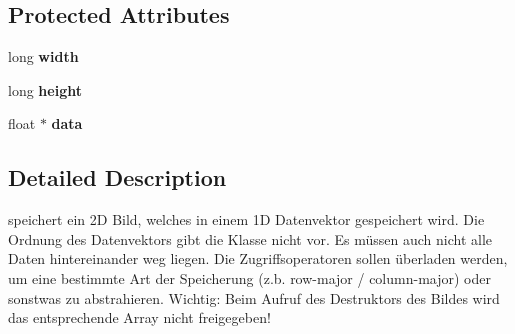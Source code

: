 \subsection*{Protected Attributes}
\begin{DoxyCompactItemize}
\item 
\hypertarget{classfloat__image_a92e539199f8cfa3c8ece64e2bdca54c7}{long {\bfseries width}}\label{classfloat__image_a92e539199f8cfa3c8ece64e2bdca54c7}

\item 
\hypertarget{classfloat__image_af7c859a1a77e6886adff0fd47976d069}{long {\bfseries height}}\label{classfloat__image_af7c859a1a77e6886adff0fd47976d069}

\item 
\hypertarget{classfloat__image_a43df6eebb483b16921cee23e80f61f5b}{float $\ast$ {\bfseries data}}\label{classfloat__image_a43df6eebb483b16921cee23e80f61f5b}

\end{DoxyCompactItemize}


\subsection{Detailed Description}
speichert ein 2\-D Bild, welches in einem 1\-D Datenvektor gespeichert wird. Die Ordnung des Datenvektors gibt die Klasse nicht vor. Es müssen auch nicht alle Daten hintereinander weg liegen. Die Zugriffsoperatoren sollen überladen werden, um eine bestimmte Art der Speicherung (z.\-b. row-\/major / column-\/major) oder sonstwas zu abstrahieren. Wichtig\-: Beim Aufruf des Destruktors des Bildes wird das entsprechende Array nicht freigegeben! 

